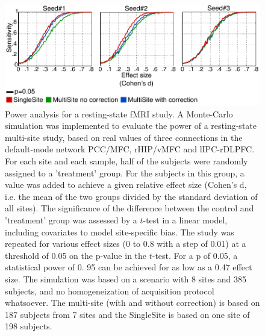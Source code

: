 \begin{figure}[H]
\begin{center}
\includegraphics[width=\linewidth]{../figures/simu_results_multisite.pdf}
\end{center}
\caption[Detection power]{
Power analysis for a resting-state fMRI study. A Monte-Carlo simulation was implemented to evaluate the power of a resting-state multi-site study, based on real values of three connections in the default-mode network PCC/MFC, rHIP/vMFC and lIPC-rDLPFC. For each site and each sample, half of the subjects were randomly assigned to a 'treatment' group. For the subjects in this group, a value was added to achieve a given relative effect size (Cohen's d, i.e. the mean of the two groups divided by the standard deviation of all sites). The significance of the difference between the control and 'treatment' group was assessed by a $t$-test in a linear model, including covariates to model site-specific bias. The study was repeated for various effect sizes (0 to 0.8 with a step of 0.01) at a threshold of 0.05 on the p-value in the $t$-test. For a p of 0.05, a statistical power of 0.
95 can be achieved for as low as a 0.47 effect size. The simulation was based on a scenario with 8 sites and 385 subjects, and no homogeneization of acquisition protocol whatsoever. The multi-site (with and without correction) is based on 187 subjects from 7 sites and the SingleSite is based on one site of 198 subjects. 
}
\label{fig_detection_power}
\end{figure}

